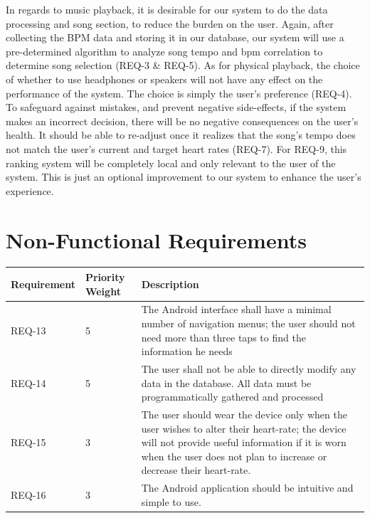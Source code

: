 \documentclass[letterpaper,english, 12pt]{scrreprt}
\begin{document}
In regards to music playback, it is desirable for our system to do the data processing and song section, to reduce the burden on the user. Again, after collecting the BPM data and storing it in our database, our system will use a pre-determined algorithm to analyze song tempo and bpm correlation to determine song selection (REQ-3 \& REQ-5). As for physical playback, the choice of whether to use headphones or speakers will not have any effect on the performance of the system. The choice is simply the user's preference (REQ-4).\\

To safeguard against mistakes, and prevent negative side-effects, if the system makes an incorrect decision, there will be no negative consequences on the user's health. It should be able to re-adjust once it realizes that the song's tempo does not match the user's current and target heart rates (REQ-7). For REQ-9, this ranking system will be completely local and only relevant to the user of the system. This is just an optional improvement to our system to enhance the user's experience.\\


\section{Non-Functional Requirements}
\begin{center}
	\begin{tabular}{|C{2cm}|C{2cm}|C{8cm}|}
		\hline
			Requirement & Priority Weight & Description \\
		\hline
			REQ-13 & 5 & The Android interface shall have a minimal number of navigation menus; the user should not need more than three taps to find the information he needs \\
		\hline
			REQ-14 & 5 & The user shall not be able to directly modify any data in the database. All data must be programmatically gathered and processed \\
		\hline
			REQ-15 & 3 & The user should wear the device only when the user wishes to alter their heart-rate; the device will not provide useful information if it is worn when the user does not plan to increase or decrease their heart-rate. \\
		\hline
			REQ-16 & 3 & The Android application should be intuitive and simple to use. \\
		\hline
	\end{tabular}
\end{center}
\end{document}
